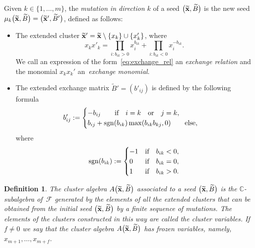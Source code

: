 \documentclass[pdftex]{sigma}%
\newtheorem{Definition}[Theorem]{Definition}
\numberwithin{equation}{section}
\begin{document}
Given $k\in \{1, \dots , m \}$, the {\it mutation in direction $k$} of a seed $\big(\widetilde{{\bf x}}, \widetilde{B}\big)$ is the new seed $\mu_k\big(\widetilde{{\bf x}}, \widetilde{B}\big)=\big(\widetilde{{\bf x}}', \widetilde{B}'\big)$, defined as follows:
\begin{itemize}\itemsep=0pt
 \item The extended cluster $\widetilde{{\bf x}}'=\widetilde{{\bf x}}\setminus\{ x_k \} \cup \{ x'_k \} $, where
 \begin{equation}
 \label{eq:exchange_rel}
 x_k x'_k= \prod_{i\colon b_{ik}>0}x^{b_{ik}}_i + \prod_{i\colon b_{ik}<0}x^{-b_{ik}}_i.
 \end{equation}
 We call an expression of the form~\eqref{eq:exchange_rel} an {\it exchange relation} and the monomial $x_kx_k'$ an~{\it exchange monomial}.
 \item The extended exchange matrix $\widetilde{B}'=(b'_{ij})$ is defined by the following formula
 \begin{displaymath}%
 b'_{ij}:= \begin{cases} -b_{ij} \qquad\text{if}\quad i=k\quad \text{or}\quad j=k,\\
 b_{ij} +\mathop{\rm sgn}(b_{ik})\mathop{\rm max}(b_{ik}b_{kj},0) \qquad\text{else},
 \end{cases}
 \end{displaymath}
 where
\[
\mathop{\rm sgn}(b_{ik}):= \begin{cases}
-1 &\text{if}\quad b_{ik}<0,\\
0 &\text{if}\quad b_{ik}=0,\\
1 &\text{if}\quad b_{ik}>0.\end{cases}
\]
\end{itemize}

\begin{Definition}\label{def:cluster algebra}
The {\it cluster algebra} $A\big(\widetilde{{\bf x}},\widetilde{B}\big)$ associated to a seed $\big(\widetilde{{\bf x}},\widetilde{B}\big) $ is the $\mathbb C$-subalgebra of~$\mathcal F$ generated by the elements of \emph{all} the extended clusters that can be obtained from the {\it initial seed} $\big(\widetilde{{\bf x}},\widetilde{B}\big)$ by a finite sequence of mutations.
The elements of the clusters constructed in this way are called the {\it cluster variables}. If $f\neq 0$ we say that the cluster algebra $A\big(\widetilde{{\bf x}},\widetilde{B}\big)$ has frozen variables, namely, $x_{m+1}, \dots , x_{m+f}$.
\end{Definition}
\end{document}
